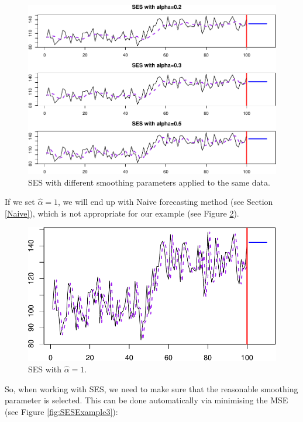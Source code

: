\documentclass[
]{book}
\theoremstyle{definition}
\theoremstyle{definition}
\theoremstyle{definition}
\theoremstyle{definition}
\theoremstyle{remark}
\begin{document}
\begin{figure}
\centering
\includegraphics{adam_files/figure-latex/SESExamples-1.pdf}
\caption{\label{fig:SESExamples}SES with different smoothing parameters applied to the same data.}
\end{figure}

If we set \(\hat{\alpha}=1\), we will end up with Naive forecasting method (see Section \ref{Naive}), which is not appropriate for our example (see Figure \ref{fig:SESExampleNaive}).

\begin{figure}
\centering
\includegraphics{adam_files/figure-latex/SESExampleNaive-1.pdf}
\caption{\label{fig:SESExampleNaive}SES with \(\hat{\alpha}=1\).}
\end{figure}

So, when working with SES, we need to make sure that the reasonable smoothing parameter is selected. This can be done automatically via minimising the MSE (see Figure \ref{fig:SESExample3}):
\end{document}
